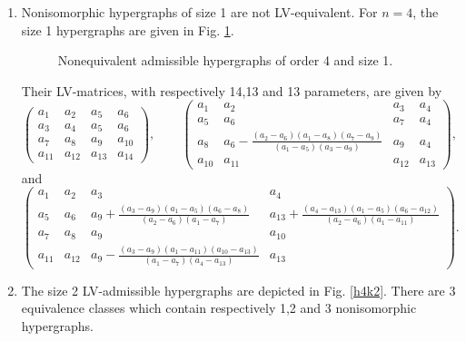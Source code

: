 \documentclass{article}
\begin{document}
\begin{enumerate}[1.]
\item Nonisomorphic hypergraphs of size 1 are not LV-equivalent. For $n=4$, the size 1 hypergraphs are given in Fig. \ref{h4k1}.

\begin{figure}[H]
\centering
{}
\caption{\label{h4k1} Nonequivalent admissible hypergraphs of order 4 and size 1.}
\end{figure}

Their LV-matrices, with respectively 14,13 and 13 parameters, are given by
\[
\begin{pmatrix}
a_{1} & a_{2} & a_{5} & a_{6} 
\\
 a_{3} & a_{4} & a_{5} & a_{6} 
\\
 a_{7} & a_{8} & a_{9} & a_{10} 
\\
 a_{11} & a_{12} & a_{13} & a_{14} 
\end{pmatrix},\qquad
\begin{pmatrix}
a_{1} & a_{2} & a_{3} & a_{4} 
\\
 a_{5} & a_{6} & a_{7} & a_{4} 
\\
 a_{8} & a_{6}-\frac{\left(a_{2}-a_{6}\right) \left(a_{1}-a_{8}\right) \left(a_{7}-a_{9}\right)}{\left(a_{1}-a_{5}\right) \left(a_{3}-a_{9}\right)} & a_{9} & a_{4} 
\\
 a_{10} & a_{11} & a_{12} & a_{13} 
\end{pmatrix},
\]
and
\[
\begin{pmatrix}
a_{1} & a_{2} & a_{3} & a_{4} 
\\
 a_{5} & a_{6} & a_{9}+\frac{\left(a_{3}-a_{9}\right) \left(a_{1}-a_{5}\right) \left(a_{6}-a_{8}\right)}{\left(a_{2}-a_{6}\right) \left(a_{1}-a_{7}\right)} & a_{13}+\frac{\left(a_{4}-a_{13}\right) \left(a_{1}-a_{5}\right) \left(a_{6}-a_{12}\right)}{\left(a_{2}-a_{6}\right) \left(a_{1}-a_{11}\right)} 
\\
 a_{7} & a_{8} & a_{9} & a_{10} 
\\
 a_{11} & a_{12} & a_{9}-\frac{\left(a_{3}-a_{9}\right) \left(a_{1}-a_{11}\right) \left(a_{10}-a_{13}\right)}{\left(a_{1}-a_{7}\right) \left(a_{4}-a_{13}\right)} & a_{13} 
\end{pmatrix}.
\]
\item 
The size 2 LV-admissible hypergraphs are depicted in Fig. \ref{h4k2}. There are 3 equivalence classes which contain respectively 1,2 and 3 nonisomorphic hypergraphs.


\end{enumerate}
\end{document}
